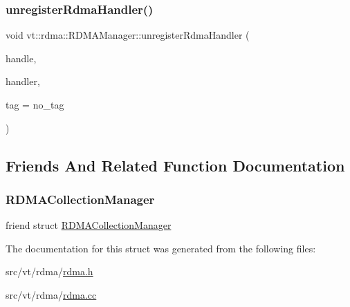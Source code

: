 \mbox{\label{structvt_1_1rdma_1_1_r_d_m_a_manager_a34e50e7536bddd880c97b60b276b63ad}} 
\subsubsection{\texorpdfstring{unregister\+Rdma\+Handler()}{unregisterRdmaHandler()}\hspace{0.1cm}{\footnotesize\ttfamily [2/2]}}
{\footnotesize\ttfamily void vt\+::rdma\+::\+R\+D\+M\+A\+Manager\+::unregister\+Rdma\+Handler (\begin{DoxyParamCaption}\item[{\hyperlink{namespacevt_a10442579ec4e7ebef223818e64bcf908}{R\+D\+M\+A\+\_\+\+Handle\+Type} const \&}]{handle,  }\item[{\hyperlink{namespacevt_a9530efb893c0f3846e8ac5f0507e0f49}{R\+D\+M\+A\+\_\+\+Handler\+Type} const \&}]{handler,  }\item[{\hyperlink{namespacevt_a84ab281dae04a52a4b243d6bf62d0e52}{Tag\+Type} const \&}]{tag = {\ttfamily no\+\_\+tag} }\end{DoxyParamCaption})}



\subsection{Friends And Related Function Documentation}
\mbox{\label{structvt_1_1rdma_1_1_r_d_m_a_manager_a59e73ef8c81ddf4094802bfda5ac42cc}} 
\subsubsection{\texorpdfstring{R\+D\+M\+A\+Collection\+Manager}{RDMACollectionManager}}
{\footnotesize\ttfamily friend struct \hyperlink{structvt_1_1rdma_1_1_r_d_m_a_collection_manager}{R\+D\+M\+A\+Collection\+Manager}\hspace{0.3cm}{\ttfamily [friend]}}



The documentation for this struct was generated from the following files\+:\begin{DoxyCompactItemize}
\item 
src/vt/rdma/\hyperlink{rdma_8h}{rdma.\+h}\item 
src/vt/rdma/\hyperlink{rdma_8cc}{rdma.\+cc}\end{DoxyCompactItemize}
